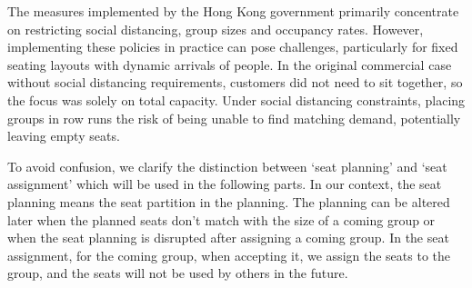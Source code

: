 

The measures implemented by the Hong Kong government primarily concentrate on restricting social distancing, group sizes and occupancy rates. However, implementing these policies in practice can pose challenges, particularly for fixed seating layouts with dynamic arrivals of people. In the original commercial case without social distancing requirements, customers did not need to sit together, so the focus was solely on total capacity. Under social distancing constraints, placing groups in row runs the risk of being unable to find matching demand, potentially leaving empty seats.

To avoid confusion, we clarify the distinction between `seat planning' and `seat assignment' which will be used in the following parts. In our context, the seat planning means the seat partition in the planning. The planning can be altered later when the planned seats don't match with the size of a coming group or when the seat planning is disrupted after assigning a coming group. In the seat assignment, for the coming group, when accepting it, we assign the seats to the group, and the seats will not be used by others in the future.

